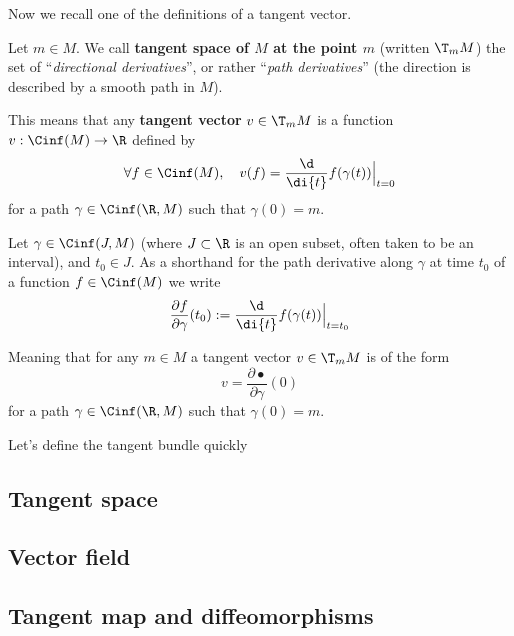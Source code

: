 
	Now we recall one of the definitions of a tangent vector.

	\begin{definition}
		Let $m \in M$.
		We call \textbf{tangent space of $M$ at the point $m$} (written $\T_m{M}$) the set of ``\emph{directional derivatives}'', or rather ``\emph{path derivatives}'' (the direction is described by a smooth path in $M$).
        
		This means that any \textbf{tangent vector} $v \in \T_m{M}$ is a function $v: \Cinf(M) \to \R$ defined by
		$$
			\forall f \in \Cinf(M), \quad v(f) = \frac{\d}{\di{t}} f(\gamma(t)) \Big|_{t=0}
		$$
		for a path $\gamma \in \Cinf(\R, M)$ such that $\gamma(0) = m$.
	\end{definition}

	\begin{notation}
		Let $\gamma \in \Cinf(J, M)$ (where $J \subset \R$ is an open subset, often taken to be an interval), and $t_0 \in J$.
		As a shorthand for the path derivative along $\gamma$ at time $t_0$ of a function $f \in \Cinf(M)$ we write 
		$$
			\frac{\partial f}{\partial \gamma}(t_0) := \frac{\d}{\di{t}} f(\gamma(t)) \Big|_{t=t_0}
		$$

		Meaning that for any $m \in M$ a tangent vector $v \in \T_m{M}$ is of the form
		$$
			v = \frac{\partial \bullet}{\partial \gamma}(0)
		$$
		for a path $\gamma \in \Cinf(\R, M)$ such that $\gamma(0) = m$.
	\end{notation}


	Let's define the tangent bundle quickly

    

	\subsection{Tangent space}
        

	\subsection{Vector field}

	\subsection{Tangent map and diffeomorphisms}

